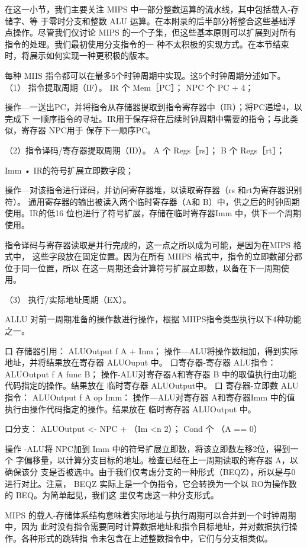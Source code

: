 在这一小节，我们主要关注 MIPS 中一部分整数运算的流水线，其中包括载入-存储字、等
于零时分支和整数 ALU 运算。在本附录的后半部分将整合这些基础浮点操作。尽管我们仅讨论
MIPS 的一个子集，但这些基本原则可以扩展到对所有指令的处理。我们最初使用分支指令的一
种不太积极的实现方式。在本节结束时，将展示如何实现一种更积极的版本。

每种 MIIS 指令都可以在最多5个时钟周期中实现。这5个时钟周期分述如下。
（1） 指令提取周期（IF）。
IR 个 Mem［PC］；
NPC 个 PC + 4；

操作—一送出PC，并将指令从存储器提取到指令寄存器中（IR）；将PC递增4，以完成下
一顺序指令的寻址。IR用于保存将在后续时钟周期中需要的指令；与此类似，寄存器 NPC用于
保存下一顺序PC。

（2）指令译码/寄存器提取周期（ID）。
A 个 Regs［rs］；
B 个 Regs［rt］；

Imm • IR的符号扩展立即数字段；

操作—对该指令进行译码，并访问寄存器堆，以读取寄存器（rs 和rt为寄存器识别符）。
通用寄存器的输出被读入两个临时寄存器（A和 B）中，供之后的时钟周期使用。IR的低16
位也进行了符号扩展，存储在临时寄存器Imm 中，供下一个周期使用。

指令译码与寄存器读取是并行完成的，这一点之所以成为可能，是因为在MIPS 格式中，
这些字段放在固定位置。因为在所有 MIIPS 格式中，指令的立即数部分都位于同一位置，所以
在这一周期还会计算符号扩展立即数，以备在下一周期使用。

（3） 执行/实际地址周期（EX）。

ALLU 对前一周期准备的操作数进行操作，根据 MIIPS指令类型执行以下4种功能之一。

口 存储器引用：
ALUOutput f A + Inm；
操作—ALU将操作数相加，得到实际地址，并将结果放在寄存器 ALUOuput 中。
口寄存器-寄存器 ALU指令：
ALUOutput f A func B；
操作-ALU对寄存器A和寄存器 B 中的取值执行由功能代码指定的操作。结果放在
临时寄存器 ALUOutput中。
口 寄存器-立即数 ALU 指令：
ALUOutput f A op Imm：
操作—ALU对寄存器 A和寄存器Imm 中的值执行由操作代码指定的操作。结果放在
临时寄存器 ALUOutput 中。

口分支：
ALUOutput <- NPC + （Im <n 2）；
Cond 个 （A == 0）

操作 -ALU将 NPC加到 Imm 中的符号扩展立即数，将该立即数左移2位，得到一个
字偏移量，以计算分支目标的地址。检查已经在上一周期读取的寄存器 A，以确保该分
支是否被选中。由于我们仅考虑分支的一种形式（BEQZ），所以是与0进行对比。注意，
BEQZ 实际上是一个伪指令，它会转换为一个以 RO为操作数的 BEQ。为简单起见，我们这
里仅考虑这一种分支形式。

MIPS 的载人-存储体系结构意味着实际地址与执行周期可以合并到一个时钟周期中，因为
此时没有指令需要同时计算数据地址和指令目标地址，并对数据执行操作。各种形式的跳转指
令未包含在上述整数指令中，它们与分支相类似。

